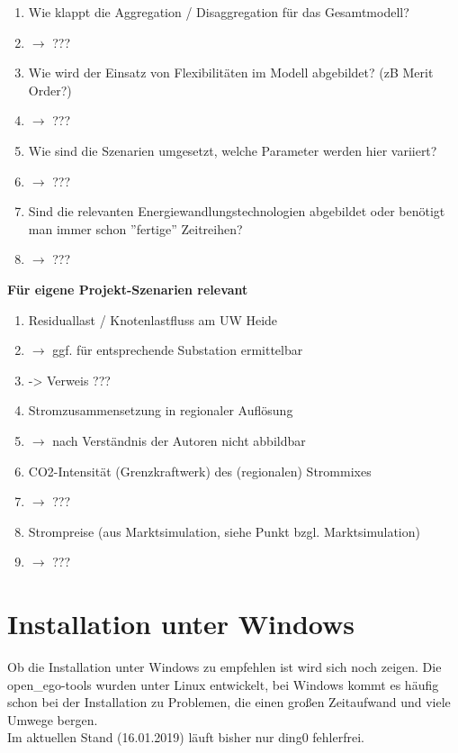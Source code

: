 \documentclass[
a4paper,     %
12pt         %
]{scrartcl}  %
\begin{document}
\begin{enumerate}
	\item Wie klappt die Aggregation / Disaggregation für das Gesamtmodell?
	\item[] $\rightarrow$ ???
	\item Wie wird der Einsatz von Flexibilitäten im Modell abgebildet? (zB Merit Order?)
	\item[] $\rightarrow$ ???
	\item Wie sind die Szenarien umgesetzt, welche Parameter werden hier variiert?
	\item[] $\rightarrow$ ???
	\item Sind die relevanten Energiewandlungstechnologien abgebildet oder benötigt man immer schon ''fertige'' Zeitreihen?
	\item[] $\rightarrow$ ???
\end{enumerate}


\textbf{Für eigene Projekt-Szenarien relevant}
\begin{enumerate}
	\item Residuallast / Knotenlastfluss am UW Heide
	\item[] $\rightarrow$ ggf. für entsprechende Substation ermittelbar
	\item[] -> Verweis ???

	\item Stromzusammensetzung in regionaler Auflösung
	\item[] $\rightarrow$ nach Verständnis der Autoren nicht abbildbar
	\item  CO2-Intensität (Grenzkraftwerk) des (regionalen) Strommixes
	\item[] $\rightarrow$ ???
	\item Strompreise (aus Marktsimulation, siehe Punkt bzgl. Marktsimulation)
	\item[] $\rightarrow$ ???



\end{enumerate}

\section{Installation unter Windows}
Ob die Installation unter Windows zu empfehlen ist wird sich noch zeigen. Die open\_ego-tools wurden unter Linux entwickelt, bei Windows kommt es häufig schon bei der Installation zu Problemen, die einen gro{\ss}en Zeitaufwand und viele Umwege bergen.\\
Im aktuellen Stand (16.01.2019) l\"auft bisher nur ding0 fehlerfrei.
\end{document}
